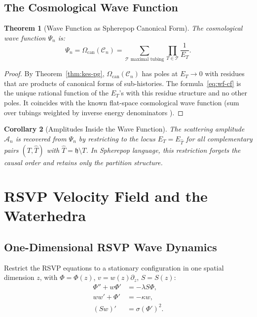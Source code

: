 \documentclass[12pt, oneside]{amsart}
\theoremstyle{plain}
\newtheorem{theorem}{Theorem}[section]
\newtheorem{corollary}[theorem]{Corollary}
\theoremstyle{definition}
\theoremstyle{remark}
\newcommand{\Phif}{\Phi}   %
\newcommand{\vf}{v}         %
\newcommand{\Sf}{S}         %
\newcommand{\hist}{\mathfrak{h}}
\newcommand{\Amp}{\mathcal{A}}
\newcommand{\WF}{\Psi}
\newcommand{\Cosmo}{\mathcal{C}_n}
\newcommand{\CF}{\Omega_{\mathrm{can}}}
\begin{document}
\subsection{The Cosmological Wave Function}

\begin{theorem}[Wave Function as Spherepop Canonical Form]
The cosmological wave function $\WF_n$ is:
\begin{equation}
\label{eq:wf-cf}
  \WF_n = \CF(\Cosmo) = \sum_{\mathcal{T}\text{ maximal tubing}} \prod_{T \in \mathcal{T}} \frac{1}{E_T}.
\end{equation}
\end{theorem}

\begin{proof}
By Theorem~\ref{thm:kes-pg}, $\CF(\Cosmo)$ has poles at $E_T \to 0$ with residues that are products of canonical forms of sub-histories. The formula~\eqref{eq:wf-cf} is the unique rational function of the $E_T$'s with this residue structure and no other poles. It coincides with the known flat-space cosmological wave function (sum over tubings weighted by inverse energy denominators \cite{BaezDolan1995}).
\end{proof}

\begin{corollary}[Amplitudes Inside the Wave Function]
The scattering amplitude $\Amp_n$ is recovered from $\WF_n$ by restricting to the locus $E_T = E_{\hat{T}}$ for all complementary pairs $(T, \hat{T})$ with $\hat{T} = \hist \setminus T$. In Spherepop language, this restriction forgets the causal order and retains only the partition structure.
\end{corollary}

\section{RSVP Velocity Field and the Waterhedra}
\label{sec:water}

\subsection{One-Dimensional RSVP Wave Dynamics}

Restrict the RSVP equations to a stationary configuration in one spatial dimension $z$, with $\Phif = \Phif(z)$, $\vf = w(z)\partial_z$, $\Sf = \Sf(z)$:
\begin{align}
  \Phif'' + w\Phif' &= -\lambda \Sf\Phif, \label{eq:1d-phi}\\
  ww' + \Phif' &= -\kappa w, \label{eq:1d-v}\\
  (\Sf w)' &= \sigma(\Phif')^2. \label{eq:1d-S}
\end{align}
\end{document}
